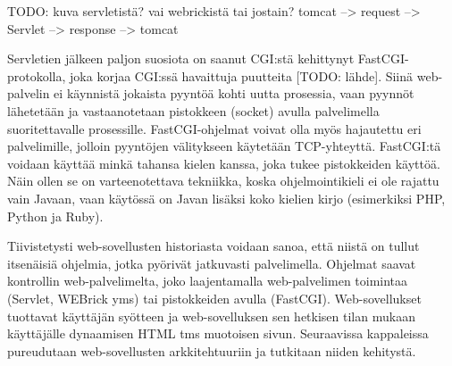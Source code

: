 TODO: kuva servletistä? vai webrickistä tai jostain? tomcat --> request --> Servlet --> response --> tomcat

Servletien jälkeen paljon suosiota on saanut CGI:stä kehittynyt FastCGI-protokolla, joka korjaa CGI:ssä havaittuja puutteita [TODO: lähde]. Siinä web-palvelin ei käynnistä jokaista pyyntöä kohti uutta prosessia, vaan pyynnöt lähetetään ja vastaanotetaan pistokkeen (socket) avulla palvelimella suoritettavalle prosessille. FastCGI-ohjelmat voivat olla myös hajautettu eri palvelimille, jolloin pyyntöjen välitykseen käytetään TCP-yhteyttä. FastCGI:tä voidaan käyttää minkä tahansa kielen kanssa, joka tukee pistokkeiden käyttöä. Näin ollen se on varteenotettava tekniikka, koska ohjelmointikieli ei ole rajattu vain Javaan, vaan käytössä on Javan lisäksi koko kielien kirjo (esimerkiksi PHP, Python ja Ruby).

Tiivistetysti web-sovellusten historiasta voidaan sanoa, että niistä on tullut itsenäisiä ohjelmia, jotka pyörivät jatkuvasti palvelimella. Ohjelmat saavat kontrollin web-palvelimelta, joko laajentamalla web-palvelimen toimintaa (Servlet, WEBrick yms) tai pistokkeiden avulla (FastCGI). Web-sovellukset tuottavat käyttäjän syötteen ja web-sovelluksen sen hetkisen tilan mukaan käyttäjälle dynaamisen HTML tms muotoisen sivun. Seuraavissa kappaleissa pureudutaan web-sovellusten arkkitehtuuriin ja tutkitaan niiden kehitystä.